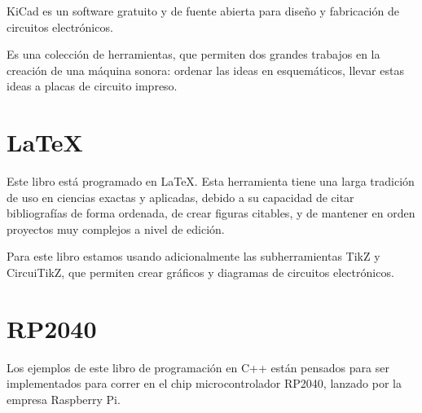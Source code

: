 \documentclass[../principal.tex]{subfiles}
\begin{document}
KiCad es un software gratuito y de fuente abierta para diseño y fabricación de circuitos electrónicos.

Es una colección de herramientas, que permiten dos grandes trabajos en la creación de una máquina sonora: ordenar las ideas en esquemáticos, llevar estas ideas a placas de circuito impreso.

\section{LaTeX}

Este libro está programado en LaTeX. Esta herramienta tiene una larga tradición de uso en ciencias exactas y aplicadas, debido a su capacidad de citar bibliografías de forma ordenada, de crear figuras citables, y de mantener en orden proyectos muy complejos a nivel de edición.

Para este libro estamos usando adicionalmente las subherramientas TikZ y CircuiTikZ, que permiten crear gráficos y diagramas de circuitos electrónicos.

\section{RP2040}

Los ejemplos de este libro de programación en C++ están pensados para ser implementados para correr en el chip microcontrolador RP2040, lanzado por la empresa Raspberry Pi.

\newpage
\end{document}
